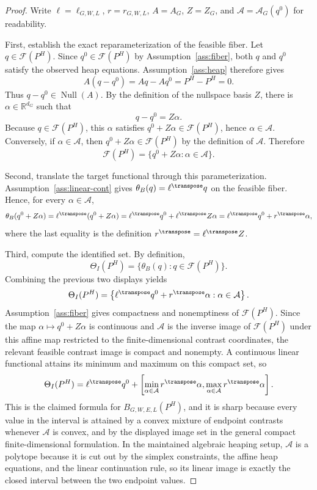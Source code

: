 \begin{proof}
Write \(\ell=\ell_{G,W,L}\), \(r=r_{G,W,L}\), \(A=A_G\), \(Z=Z_G\), and \(\mathcal{A}=\mathcal{A}_G(q^0)\) for readability.

First, establish the exact reparameterization of the feasible fiber.  Let \(q\in\mathcal{F}(P^H)\).  Since \(q^0\in\mathcal{F}(P^H)\) by Assumption~\ref{ass:fiber}, both \(q\) and \(q^0\) satisfy the observed heap equations.  Assumption~\ref{ass:heap} therefore gives
\[
A(q-q^0)=Aq-Aq^0=P^H-P^H=0.
\]
Thus \(q-q^0\in\operatorname{Null}(A)\).  By the definition of the nullspace basis \(Z\), there is \(\alpha\in\mathbb{R}^{d_G}\) such that
\[
q-q^0=Z\alpha.
\]
Because \(q\in\mathcal{F}(P^H)\), this \(\alpha\) satisfies \(q^0+Z\alpha\in\mathcal{F}(P^H)\), hence \(\alpha\in\mathcal{A}\).  Conversely, if \(\alpha\in\mathcal{A}\), then \(q^0+Z\alpha\in\mathcal{F}(P^H)\) by the definition of \(\mathcal{A}\).  Therefore
\[
\mathcal{F}(P^H)=\{q^0+Z\alpha:\alpha\in\mathcal{A}\}.
\]

Second, translate the target functional through this parameterization.  Assumption~\ref{ass:linear-cont} gives \(\theta_B(q)=\ell^{\transpose}q\) on the feasible fiber.  Hence, for every \(\alpha\in\mathcal{A}\),
\[
\theta_B(q^0+Z\alpha)
=\ell^{\transpose}(q^0+Z\alpha)
=\ell^{\transpose}q^0+\ell^{\transpose}Z\alpha
=\ell^{\transpose}q^0+r^{\transpose}\alpha,
\]
where the last equality is the definition \(r^{\transpose}=\ell^{\transpose}Z\).

Third, compute the identified set.  By definition,
\[
\Theta_I(P^H)=\{\theta_B(q):q\in\mathcal{F}(P^H)\}.
\]
Combining the previous two displays yields
\[
\Theta_I(P^H)
=
\left\{\ell^{\transpose}q^0+r^{\transpose}\alpha:
\alpha\in\mathcal{A}\right\}.
\]
Assumption~\ref{ass:fiber} gives compactness and nonemptiness of \(\mathcal{F}(P^H)\).  Since the map \(\alpha\mapsto q^0+Z\alpha\) is continuous and \(\mathcal{A}\) is the inverse image of \(\mathcal{F}(P^H)\) under this affine map restricted to the finite-dimensional contrast coordinates, the relevant feasible contrast image is compact and nonempty.  A continuous linear functional attains its minimum and maximum on this compact set, so
\[
\Theta_I(P^H)=
\ell^{\transpose}q^0+
\left[
\min_{\alpha\in\mathcal{A}}r^{\transpose}\alpha,
\max_{\alpha\in\mathcal{A}}r^{\transpose}\alpha
\right].
\]
This is the claimed formula for \(B_{G,W,E,L}(P^H)\), and it is sharp because every value in the interval is attained by a convex mixture of endpoint contrasts whenever \(\mathcal{A}\) is convex, and by the displayed image set in the general compact finite-dimensional formulation.  In the maintained algebraic heaping setup, \(\mathcal{A}\) is a polytope because it is cut out by the simplex constraints, the affine heap equations, and the linear continuation rule, so its linear image is exactly the closed interval between the two endpoint values.


\end{proof}
